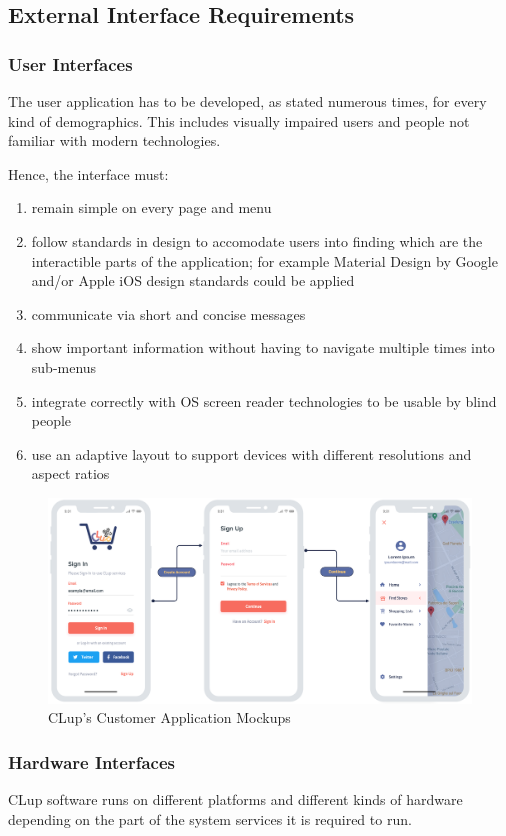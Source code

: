 \subsection{External Interface Requirements}
\subsubsection{User Interfaces}
The user application has to be developed, as stated numerous times, for every kind of demographics.
This includes visually impaired users and people not familiar with modern technologies.

Hence, the interface must:
\begin{enumerate}
    \item remain simple on every page and menu
    \item follow standards in design to accomodate users into finding which are the interactible parts of the application; for example Material Design by Google and/or Apple iOS design standards could be applied
    \item communicate via short and concise messages
    \item show important information without having to navigate multiple times into sub-menus
    \item integrate correctly with OS screen reader technologies to be usable by blind people
    \item use an adaptive layout to support devices with different resolutions and aspect ratios
\end{enumerate}


\begin{figure}[H]
    \includegraphics[width=\textwidth]{Images/customer_app_mockups.png}
    \caption{CLup's Customer Application Mockups}
\end{figure}

\subsubsection{Hardware Interfaces}
CLup software runs on different platforms and different kinds of hardware depending on the part of the system services it is required to run.

